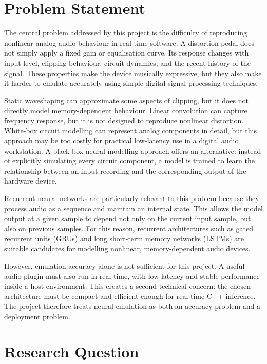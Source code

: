 \section{Problem Statement}
\label{sec:introduction-problem}

The central problem addressed by this project is the difficulty of reproducing nonlinear analog audio behaviour in real-time software. A distortion pedal does not simply apply a fixed gain or equalisation curve. Its response changes with input level, clipping behaviour, circuit dynamics, and the recent history of the signal. These properties make the device musically expressive, but they also make it harder to emulate accurately using simple digital signal processing techniques.

Static waveshaping can approximate some aspects of clipping, but it does not directly model memory-dependent behaviour. Linear convolution can capture frequency response, but it is not designed to reproduce nonlinear distortion. White-box circuit modelling can represent analog components in detail, but this approach may be too costly for practical low-latency use in a digital audio workstation. A black-box neural modelling approach offers an alternative: instead of explicitly simulating every circuit component, a model is trained to learn the relationship between an input recording and the corresponding output of the hardware device.

Recurrent neural networks are particularly relevant to this problem because they process audio as a sequence and maintain an internal state. This allows the model output at a given sample to depend not only on the current input sample, but also on previous samples. For this reason, recurrent architectures such as gated recurrent units (GRUs) and long short-term memory networks (LSTMs) are suitable candidates for modelling nonlinear, memory-dependent audio devices.

However, emulation accuracy alone is not sufficient for this project. A useful audio plugin must also run in real time, with low latency and stable performance inside a host environment. This creates a second technical concern: the chosen architecture must be compact and efficient enough for real-time C++ inference. The project therefore treats neural emulation as both an accuracy problem and a deployment problem.

\section{Research Question}
\label{sec:introduction-research-question}


